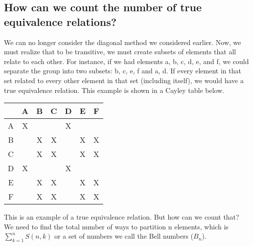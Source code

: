 \documentclass[11pt,twosided]{article}
\begin{document}
\subsection{How can we count the number of true equivalence relations?}
We can no longer consider the diagonal method we considered earlier. Now, we must realize that to be transitive, we must create subsets of elements that all relate to each other. For instance, if we had elements a, b, c, d, e, and f, we could separate the group into two subsets: {b, c, e, f} and {a, d}. If every element in that set related to every other element in that set (including itself), we would have a true equivalence relation. This example is shown in a Cayley table below.
\begin{center}
\begin{tabular} {c|c c c c c c}
& A & B & C & D & E & F \\
\hline
A & X &  &  & X & & \\
B &  & X & X &  & X & X \\
C &  & X & X & & X & X \\
D & X &  &  & X & &\\
E &  & X & X &  & X & X\\
F &  & X & X &  & X & X\\
\end{tabular}
\end{center}
This is an example of a true equivalence relation. But how can we count that? We need to find the total number of ways to partition n elements, which is \(\sum^{n}_{k=1}S(n,k)\) or a set of numbers we call the Bell numbers (\(B_{n}\)).
\end{document}
